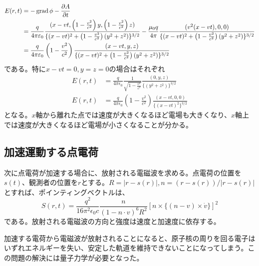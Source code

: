     \begin{align*}
        E(r, t)
        &= -\grad\phi - \pd[A]{t}\\
        &= \frac{q}{4\pi\epsilon_0}\frac{(x - vt, \left(1 - \frac{v^2}{c^2}\right)y, \left(1 - \frac{v^2}{c^2}\right)z)}{\{(x - vt)^2 + \left(1 - \frac{v^2}{c^2}\right)(y^2 + z^2)\}^{3/2}} - \frac{\mu_0q}{4\pi}\frac{(v^2(x - vt), 0, 0)}{\{(x - vt)^2 + \left(1 - \frac{v^2}{c^2}\right)(y^2 + z^2)\}^{3/2}}\\
        &= \frac{q}{4\pi\epsilon_0}\left(1 - \frac{v^2}{c^2}\right)\frac{(x - vt, y, z)}{\{(x - vt)^2 + \left(1 - \frac{v^2}{c^2}\right)(y^2 + z^2)\}^{3/2}}
    \end{align*}
    である。特に$x - vt = 0, y = z = 0$の場合はそれぞれ
    \begin{align*}
        E(r, t) &= \frac{q}{4\pi\epsilon_0}\frac{1}{\sqrt{1 - \frac{v^2}{c^2}}}\frac{(0, y, z)}{\{(y^2 + z^2)\}^{3/2}}\\
        E(r, t) &= \frac{q}{4\pi\epsilon_0}\left(1 - \frac{v^2}{c^2}\right)\frac{(x - vt, 0, 0)}{\{(x - vt)^2\}^{3/2}}
    \end{align*}
    となる。$x$軸から離れた点では速度が大きくなるほど電場も大きくなり、$x$軸上では速度が大きくなるほど電場が小さくなることが分かる。

\subsection{加速運動する点電荷}
    次に点電荷が加速する場合に、放射される電磁波を求める。点電荷の位置を$s(t)$、観測者の位置を$r$とする。$R = |r-s(r)|,n = (r-s(r))/|r-s(r)|$とすれば、ポインティングベクトルは、
        \[S(r, t) = \frac{q^2}{16\pi^2\epsilon_0c}\frac{n}{(1 - n \cdot v)^6R^2}[n \times \{(n - v) \times \dot{v}\}]^2\]
    である。放射される電磁波の方向と強度は速度と加速度に依存する。

    加速する電荷から電磁波が放射されることになると、原子核の周りを回る電子はいずれエネルギーを失い、安定した軌道を維持できないことになってしまう。この問題の解決には量子力学が必要となった。